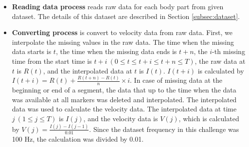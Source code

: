 \documentclass[graybox]{svmult}
\begin{document}
\begin{itemize}
    \item {\bf Reading data process} reads raw data for each body part from given dataset. The details of this dataset are described in Section \ref{subsec:dataset}.
    
    \item {\bf Converting process} is convert to velocity data from raw data. First, we interpolate the missing values in the raw data. The time when the missing data starts is $t$, the time when the missing data ends is $t+n$, the $i$-th missing time from the start time is $t+i ~(0\leq t \leq t+i \leq t+n \leq T)$, the raw data at $t$ is $R(t)$, and the interpolated data at $t$ is $I(t)$. $I(t+i)$ is calculated by $I(t+i)=R(t) + \frac{R(t+n)-R(t)}{n}\times i$. In case of missing data at the beginning or end of a segment, the data that up to the time when the data was available at all markers was deleted and interpolated. The interpolated data was used to calculate the velocity data. The interpolated data at time $j~(1\leq j\leq T)$ is $I(j)$, and the velocity data is $V(j)$, which is calculated by $V(j)=\frac{I(j)-I(j-1)}{0.01}$. Since the dataset frequency in this challenge was 100 Hz, the calculation was divided by 0.01.
    

\end{itemize}
\end{document}
